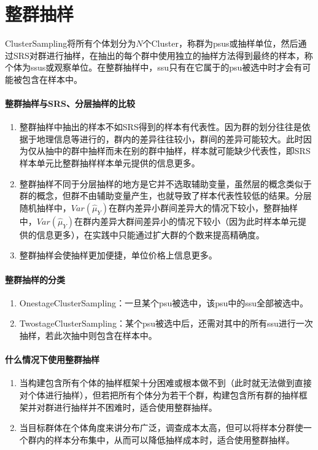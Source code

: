 \chapter{整群抽样}
\gls{ClusterSampling}将所有个体划分为$N$个\gls{Cluster}，称群为\gls{psus}或抽样单位，然后通过SRS对群进行抽样，在抽出的每个群中使用独立的抽样方法得到最终的样本，称个体为\gls{ssus}或观察单位。在整群抽样中，ssu只有在它属于的psu被选中时才会有可能被包含在样本中。

\subsubsection{整群抽样与SRS、分层抽样的比较}
\begin{enumerate}
	\item 整群抽样中抽出的样本不如SRS得到的样本有代表性。因为群的划分往往是依据于地理信息等进行的，群内的差异往往较小，群间的差异可能较大。此时因为仅从抽中的群中抽样而未在别的群中抽样，样本就可能缺少代表性，即SRS样本单元比整群抽样样本单元提供的信息更多。
	\item 整群抽样不同于分层抽样的地方是它并不选取辅助变量，虽然层的概念类似于群的概念，但群不由辅助变量产生，也就导致了样本代表性较低的结果。分层随机抽样中，$Var(\hat{\mu}_Y)$在群内差异小群间差异大的情况下较小，整群抽样中，$Var(\hat{\mu}_Y)$在群内差异大群间差异小的情况下较小（因为此时样本单元提供的信息更多），在实践中只能通过扩大群的个数来提高精确度。
	\item 整群抽样会使抽样更加便捷，单位价格上信息更多。
\end{enumerate}
\subsubsection{整群抽样的分类}
\begin{enumerate}
	\item \gls{OnestageClusterSampling}：一旦某个psu被选中，该psu中的ssu全部被选中。
	\item \gls{TwostageClusterSampling}：某个psu被选中后，还需对其中的所有ssu进行一次抽样，若此次抽中则包含在样本中。
\end{enumerate}
\subsubsection{什么情况下使用整群抽样}
\begin{enumerate}
	\item 当构建包含所有个体的抽样框架十分困难或根本做不到（此时就无法做到直接对个体进行抽样），但若把所有个体分为若干个群，构建包含所有群的抽样框架并对群进行抽样并不困难时，适合使用整群抽样。
	\item 当目标群体在个体角度来讲分布广泛，调查成本太高，但可以将样本分群使一个群内的样本分布集中，从而可以降低抽样成本时，适合使用整群抽样。
\end{enumerate}



